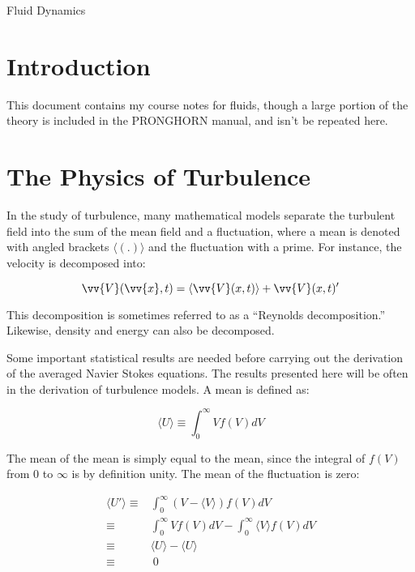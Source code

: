 \documentclass[10pt]{article}
\newcommand{\beq}{\begin{equation}}
\newcommand{\eeq}{\end{equation}}
\newcommand{\beqa}{\begin{equation}\begin{aligned}}
\newcommand{\eeqa}{\end{aligned}\end{equation}}
\newcommand{\la}{\langle}
\newcommand{\ra}{\rangle}
\begin{document}
\begin{centering}
\large Fluid Dynamics\\
\end{centering}

\tableofcontents
\clearpage

\section{Introduction}
\begin{flushleft}\justify

This document contains my course notes for fluids, though a large portion of the theory is included in the PRONGHORN manual, and isn't be repeated here.

\section{The Physics of Turbulence}

In the study of turbulence, many mathematical models separate the turbulent field into the sum of the mean field and a fluctuation, where a mean is denoted with angled brackets \(\la(.)\ra\) and the fluctuation with a prime. For instance, the velocity is decomposed into:

\beq
\vv{V}(\vv{x},t)=\la\vv{V}(x,t)\rangle+\vv{V}(x,t)'
\eeq

This decomposition is sometimes referred to as a ``Reynolds decomposition.'' Likewise, density and energy can also be decomposed. 

\begin{tcolorbox}[breakable]
Some important statistical results are needed before carrying out the derivation of the averaged Navier Stokes equations. The results presented here will be often in the derivation of turbulence models. A mean is defined as:

\beq
\la U\ra\equiv\int_{0}^{\infty}Vf(V)dV
\eeq

The mean of the mean is simply equal to the mean, since the integral of \(f(V)\) from 0 to \(\infty\) is by definition unity. The mean of the fluctuation is zero:

\beqa
\la U'\ra\equiv&\int_{0}^{\infty}(V-\la V\ra)f(V)dV\\
\equiv& \int_{0}^{\infty}Vf(V)dV - \int_{0}^{\infty}\la V\ra f(V)dV\\
\equiv&\la U\ra - \la U\ra\\
\equiv&\ 0\\
\eeqa


\end{tcolorbox}
\end{flushleft}
\end{document}
